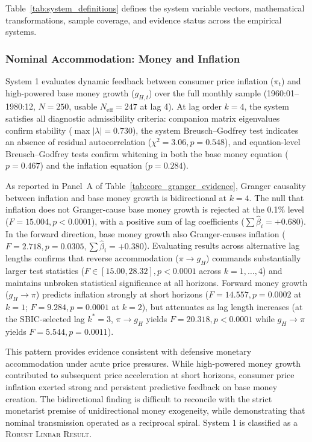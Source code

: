 Table~\ref{tab:system_definitions} defines the system variable vectors, mathematical transformations, sample coverage, and evidence status across the empirical systems.


\subsubsection{Nominal Accommodation: Money and Inflation}
\label{sec:granger_nominal_core}

System 1 evaluates dynamic feedback between consumer price inflation ($\pi_t$) and high-powered base money growth ($g_{H,t}$) over the full monthly sample (1960:01--1980:12, $N=250$, usable $N_{\text{eff}}=247$ at lag 4). At lag order $k=4$, the system satisfies all diagnostic admissibility criteria: companion matrix eigenvalues confirm stability ($\max |\lambda| = 0.730$), the system Breusch--Godfrey test indicates an absence of residual autocorrelation ($\chi^2 = 3.06, p = 0.548$), and equation-level Breusch--Godfrey tests confirm whitening in both the base money equation ($p = 0.467$) and the inflation equation ($p = 0.284$).

As reported in Panel~A of Table~\ref{tab:core_granger_evidence}, Granger causality between inflation and base money growth is bidirectional at $k=4$. The null that inflation does not Granger-cause base money growth is rejected at the 0.1\% level ($F = 15.004, p < 0.0001$), with a positive sum of lag coefficients ($\sum \hat{\beta}_i = +0.680$). In the forward direction, base money growth also Granger-causes inflation ($F = 2.718, p = 0.0305, \sum \hat{\beta}_i = +0.380$). Evaluating results across alternative lag lengths confirms that reverse accommodation ($\pi \to g_H$) commands substantially larger test statistics ($F \in [15.00, 28.32], p < 0.0001$ across $k=1,\dots,4$) and maintains unbroken statistical significance at all horizons. Forward money growth ($g_H \to \pi$) predicts inflation strongly at short horizons ($F = 14.557, p = 0.0002$ at $k=1$; $F = 9.284, p = 0.0001$ at $k=2$), but attenuates as lag length increases (at the SBIC-selected lag $k^*=3$, $\pi \to g_H$ yields $F = 20.318, p < 0.0001$ while $g_H \to \pi$ yields $F = 5.544, p = 0.0011$).

This pattern provides evidence consistent with defensive monetary accommodation under acute price pressures. While high-powered money growth contributed to subsequent price acceleration at short horizons, consumer price inflation exerted strong and persistent predictive feedback on base money creation. The bidirectional finding is difficult to reconcile with the strict monetarist premise of unidirectional money exogeneity, while demonstrating that nominal transmission operated as a reciprocal spiral. System 1 is classified as a \textsc{Robust Linear Result}.

